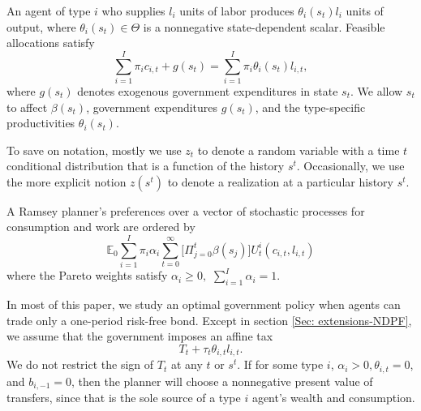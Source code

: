\documentclass[thmsb,11pt]{article}
\begin{document}
An agent of type $i$ who supplies $l_{i}$ units of labor produces $\theta
_{i}\left( s_t\right) l_{i}$ units of output, where $\theta _{i}(s_t)\in \Theta $
is a nonnegative state-dependent scalar. Feasible allocations satisfy
\begin{equation}%
\sum_{i=1}^{I}\pi_{i}c_{i,t}+g\left( s_{t}\right) =\sum_{i=1}^{I}\pi
_{i}\theta _{i}\left( s_{t}\right) l_{i,t},  \label{feasibility goods}
\end{equation}%
where $g\left( s_{t}\right) $ denotes exogenous government expenditures in
state $s_{t}.$
 We allow $s_t$ to
affect $\beta(s_t)$, government expenditures $g(s_t)$, and the type-specific productivities $\theta_i(s_t)$.

To save on notation, mostly we
use $z_{t}$ to denote a random variable with a time $t$ conditional
distribution that is a function of the history $s^{t}$.
 Occasionally, we use the more explicit notion $z\left(
s^{t}\right) $ to denote a realization  at
a particular history $s^{t}.$


A Ramsey  planner's preferences over a vector of stochastic processes for consumption and
work are ordered by
\begin{equation}
\mathbb{E}_{0}\sum_{i=1}^{I}\pi _{i}\alpha _{i}\sum_{t=0}^{\infty }\bigl[\Pi_{j=0}^t \beta(s_j)\bigr] U_{t}^{i}\left( c_{i,t},l_{i,t}\right)  \label{govmt objective}
\end{equation}%
where the Pareto weights satisfy $\alpha _{i}\geq 0,$ $\sum_{i=1}^{I}\alpha _{i}=1$.

In most of this paper, we study an optimal  government policy when agents can   trade
only a one-period risk-free bond.  Except in section \ref{Sec: extensions-NDPF}, we assume that the government  imposes an
affine tax
\begin{equation*}
T_t + \tau_t \theta_{i,t}l_{i,t}. \end{equation*}
We do not restrict the sign of $T_{t}$ at any $t$ or $s^t$. %
If for some type $i$, $\alpha_i >0, \theta _{i,t}=0$, and $b_{i, -1} = 0$, then  the planner will choose a nonnegative  present value of
transfers, since that is the sole source of a type $i$ agent's wealth and consumption.
\end{document}
